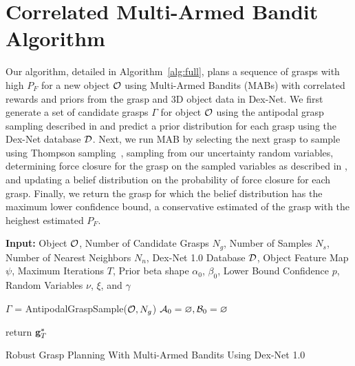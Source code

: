 \section{Correlated Multi-Armed Bandit Algorithm}
Our algorithm, detailed in Algorithm~\ref{alg:full}, plans a sequence of grasps with high $P_F$ for a new object $\mathcal{O}$ using Multi-Armed Bandits (MABs) with correlated rewards and priors from the grasp and 3D object data in Dex-Net.
We first generate a set of candidate grasps $\Gamma$ for object $\mathcal{O}$ using the antipodal grasp sampling described in  and predict a prior distribution for each grasp using the Dex-Net database $\mathcal{D}$.
Next, we run MAB by selecting the next grasp to sample using Thompson sampling~\cite{laskey2015bandits}, sampling from our uncertainty random variables, determining force closure for the grasp on the sampled variables as described in , and updating a belief distribution on the probability of force closure for each grasp.
Finally, we return the grasp for which the belief distribution has the maximum lower confidence bound, a conservative estimated of the grasp with the heighest estimated $P_F$.

\begin{algorithm}
{\small
    \SetAlgoLined
    {\bf Input:} Object $\mathcal{O}$, Number of Candidate Grasps $N_g$, Number of Samples $N_s$, Number of Nearest Neighbors $N_n$, Dex-Net 1.0 Database $\mathcal{D}$, Object Feature Map $\psi$,  Maximum Iterations $T$, Prior beta shape $\alpha_0$, $\beta_0$, Lower Bound Confidence $p$, Random Variables $\nu$, $\xi$, and $\gamma$ \\
    
	$\Gamma$ = AntipodalGraspSample($\mathcal{O}, N_g$) \;
	$\mathcal{A}_0 = \varnothing, \mathcal{B}_0 = \varnothing$\;
	
	return $\mathbf{g}_T^*$\;
    \caption{Robust Grasp Planning With Multi-Armed Bandits Using Dex-Net 1.0}
    \label{alg:full}
}
\end{algorithm}

